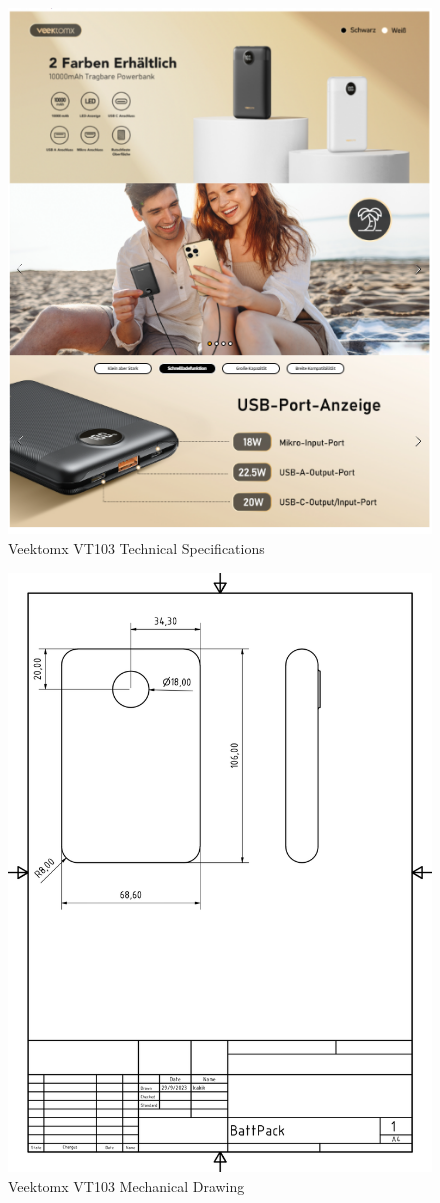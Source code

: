 \begin{figure}[H]
    \centering
    \includegraphics[width=0.85\linewidth]{texs/appendix/data/techspecs/battspecs.png}
    \caption{Veektomx VT103 Technical Specifications }
    \label{fig:battery-1}
\end{figure}

\begin{figure}[H]
    \centering
    \includegraphics[width=0.85\linewidth]{texs/appendix/data/techspecs/battmechdraw.jpg}
    \caption{Veektomx VT103 Mechanical Drawing }
    \label{fig:battery-2}
\end{figure}

